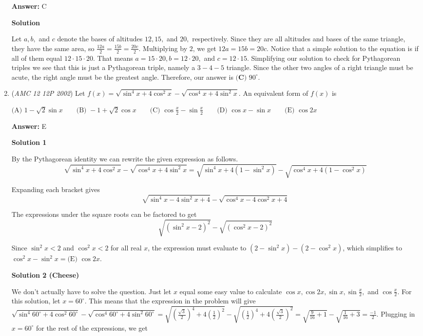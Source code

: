 \begin{enumerate}
 \textbf{Answer: }C



\textbf{Solution}

Let $a, b,$ and $c$ denote the bases of altitudes $12, 15,$ and $20,$ respectively. Since they are all altitudes and bases of the same triangle, they have the same area, so $\frac{12a}{2}=\frac{15b}{2}=\frac{20c}{2}.$ Multiplying by $2$, we get $12a=15b=20c.$ Notice that a simple solution to the equation is if all of them equal $12 \cdot 15 \cdot 20.$ That means $a=15 \cdot 20, b=12 \cdot 20,$ and $c=12 \cdot 15.$ Simplifying our solution to check for Pythagorean triples we see that this is just a Pythagorean triple, namely a $3-4-5$ triangle. Since the other two angles of a right triangle must be acute, the right angle must be the greatest angle. Therefore, our answer is $\boxed{\textbf{(C) }90^\circ}.$



	\item (\textit{AMC 12 12P 2002}) Let $f(x) = \sqrt{\sin^4{x} + 4 \cos^2{x}} - \sqrt{\cos^4{x} + 4 \sin^2{x}}.$ An equivalent form of $f(x)$ is


 $\text{(A) }1-\sqrt{2}\sin{x} \qquad \text{(B) }-1+\sqrt{2}\cos{x} \qquad \text{(C) }\cos{\frac{x}{2}} - \sin{\frac{x}{2}} \qquad \text{(D) }\cos{x} - \sin{x} \qquad \text{(E) }\cos{2x}$

 \textbf{Answer: }E



\textbf{Solution 1}

By the Pythagorean identity we can rewrite the given expression as follows.
 \[\sqrt{\sin^4{x} + 4 \cos^2{x}} - \sqrt{\cos^4{x} + 4 \sin^2{x}} = \sqrt{\sin^4{x} + 4(1 - \sin^2{x})} - \sqrt{\cos^4{x} + 4(1 - \cos^2{x})}\]

 Expanding each bracket gives 
 \[\sqrt{\sin^4{x} - 4\sin^2{x} + 4} - \sqrt{\cos^4{x} - 4\cos^2{x} + 4}\]

 The expressions under the square roots can be factored to get 
 \[\sqrt{(\sin^2{x} - 2)^2} - \sqrt{(\cos^2{x} - 2)^2}\]

 Since $\sin^2{x} < 2$ and $\cos^2{x} < 2$ for all real $x$, the expression must evaluate to $(2 - \sin^2{x}) - (2 - \cos^2{x})$, which simplifies to $\cos^2{x} - \sin^2{x} = \boxed {\text{(E) }\cos{2x}}$.

 



\textbf{Solution 2 (Cheese)}

We don't actually have to solve the question. Just let $x$ equal some easy value to calculate $\cos {x}, \cos {2x}, \sin {x}, \sin {\frac{x}{2}},$ and $\cos {\frac{x}{2}}.$ For this solution, let $x=60^\circ.$ This means that the expression in the problem will give $\sqrt{\sin^4{60^\circ} + 4 \cos^2{60^\circ}} - \sqrt{\cos^4{60^\circ} + 4 \sin^2{60^\circ}}=\sqrt{(\frac{\sqrt{3}}{2})^4 + 4(\frac{1}{2})^2} - \sqrt{(\frac{1}{2})^4 + 4(\frac{\sqrt{3}}{2})^2}=\sqrt{\frac{9}{16} +1} - \sqrt{\frac{1}{16} + 3} = \frac{-1}{2}.$ Plugging in $x=60^\circ$ for the rest of the expressions, we get


\end{enumerate}
